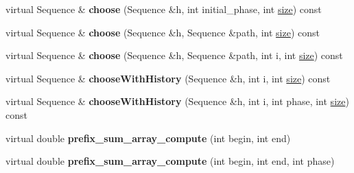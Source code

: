 \begin{DoxyCompactItemize}
\item 
\mbox{\label{classtops_1_1ProbabilisticModelDecorator_a07db74cc5d6577e76ac06354047afa86}} 
virtual Sequence \& {\bfseries choose} (Sequence \&h, int initial\+\_\+phase, int \hyperlink{classtops_1_1ProbabilisticModel_a4e3910e9b9b848b7078e7101909ae82a}{size}) const
\item 
\mbox{\label{classtops_1_1ProbabilisticModelDecorator_a5221447a9f12c7719794bf9a16c23fd9}} 
virtual Sequence \& {\bfseries choose} (Sequence \&h, Sequence \&path, int \hyperlink{classtops_1_1ProbabilisticModel_a4e3910e9b9b848b7078e7101909ae82a}{size}) const
\item 
\mbox{\label{classtops_1_1ProbabilisticModelDecorator_a97efb9d561d59a6ce9490749cfb6ca4e}} 
virtual Sequence \& {\bfseries choose} (Sequence \&h, Sequence \&path, int i, int \hyperlink{classtops_1_1ProbabilisticModel_a4e3910e9b9b848b7078e7101909ae82a}{size}) const
\item 
\mbox{\label{classtops_1_1ProbabilisticModelDecorator_a65982032c8b451a9ef0773f7662b0a85}} 
virtual Sequence \& {\bfseries choose\+With\+History} (Sequence \&h, int i, int \hyperlink{classtops_1_1ProbabilisticModel_a4e3910e9b9b848b7078e7101909ae82a}{size}) const
\item 
\mbox{\label{classtops_1_1ProbabilisticModelDecorator_a9ecbad26890a55ab8ca31c892d3cb4e1}} 
virtual Sequence \& {\bfseries choose\+With\+History} (Sequence \&h, int i, int phase, int \hyperlink{classtops_1_1ProbabilisticModel_a4e3910e9b9b848b7078e7101909ae82a}{size}) const
\item 
\mbox{\label{classtops_1_1ProbabilisticModelDecorator_a5629992735f6c7d9d03b92d769039cc0}} 
virtual double {\bfseries prefix\+\_\+sum\+\_\+array\+\_\+compute} (int begin, int end)
\item 
\mbox{\label{classtops_1_1ProbabilisticModelDecorator_a98d0a7c3959ba17834a469bedf6fc03b}} 
virtual double {\bfseries prefix\+\_\+sum\+\_\+array\+\_\+compute} (int begin, int end, int phase)

\end{DoxyCompactItemize}
